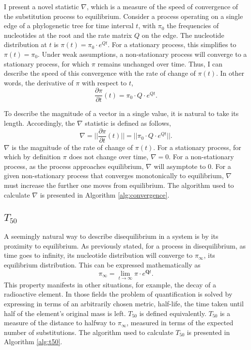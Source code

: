I present a novel statistic $\nabla$, which is a measure of the speed of convergence of the substitution process to equilibrium. Consider a process operating on a single edge of a phylogenetic tree for time interval $t$, with $\pi_0$ the frequencies of nucleotides at the root and the rate matrix $Q$ on the edge. The nucleotide distribution at $t$ is $\pi(t) = \pi_{0} \cdot e^{Qt}$. For a stationary process, this simplifies to $\pi(t) = \pi_{0}$. Under weak assumptions, a non-stationary process will converge to a stationary process, for which $\pi$ remains unchanged over time. Thus, I can describe the speed of this convergence with the rate of change of $\pi(t)$. In other words, the derivative of $\pi$ with respect to $t$,
\begin{equation}
\label{eq:dpi/dt}
\frac{\partial \pi}{\partial t}(t) = \pi_{0} \cdot Q \cdot e^{Qt}.
\end{equation}

To describe the magnitude of a vector in a single value, it is natural to take its length. Accordingly, the $\nabla$ statistic is defined as follows,
\begin{equation}
\label{eq:len-dpi/dt}
\nabla = ||\frac{\partial \pi}{\partial t}(t)|| =|| \pi_{0} \cdot Q \cdot e^{Qt}||.
\end{equation}
$\nabla$ is the magnitude of the rate of change of $\pi(t)$. For a stationary process, for which by definition $\pi$ does not change over time, $\nabla = 0$. For a non-stationary process, as the process approaches equilibrium, $\nabla$ will asymptote to $0$. For a given non-stationary process that converges monotonically to equilibrium, $\nabla$ must increase the further one moves from equilibrium. The algorithm used to calculate $\nabla$ is presented in Algorithm \ref{alg:convergence}.



\subsection{$T_{50}$}
\label{T50}

A seemingly natural way to describe disequilibrium in a system is by its proximity to equilibrium. As previously stated, for a process in disequilibrium, as time goes to infinity, its nucleotide distribution will converge to $\pi_\infty$, its equilibrium distribution. This can be expressed mathematically as 
$$\pi_\infty = \lim_{t \to \infty}\pi \cdot e^{\mathbf{Q}t}.$$ 
This property manifests in other situations, for example, the decay of a radioactive element. In those fields the problem of quantification is solved by expressing in terms of an arbitrarily chosen metric, half-life, the time taken until half of the element's original mass is left. $T_{50}$ is defined equivalently. ${T_{50}}$ is a measure of the distance to halfway to $\pi_\infty$, measured in terms of the expected number of substitutions. The algorithm used to calculate $T_{50}$ is presented in Algorithm \ref{alg:t50}.

